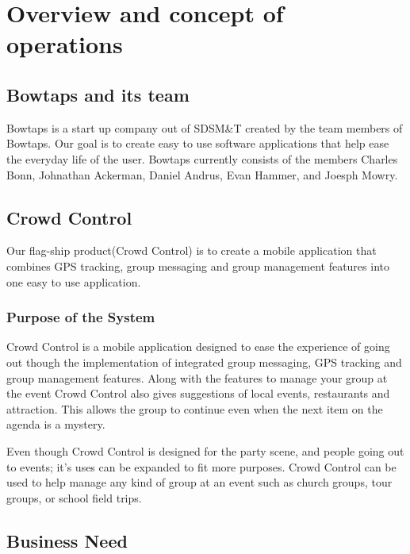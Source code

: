 

\chapter{Overview and concept of operations}


\section{Bowtaps and its team}

Bowtaps is a start up company out of SDSM\&T created by the team members of Bowtaps. Our goal is to create easy to use software applications that help ease the everyday life of the user. Bowtaps currently consists of the members Charles Bonn, Johnathan Ackerman, Daniel Andrus, Evan Hammer, and Joesph Mowry.

\section{Crowd Control}
Our flag-ship product(Crowd Control) is to create a mobile application that combines GPS tracking, group messaging and group management features into one easy to use application. 

\subsection{Purpose of the System}
Crowd Control is a mobile application designed to ease the experience of going out though the implementation of integrated group messaging, GPS tracking and group management features. Along with the features to manage your group at the event Crowd Control also gives suggestions of local events, restaurants and attraction. This allows the group to continue even when the next item on the agenda is a mystery. 


Even though Crowd Control is designed for the party scene, and people going out to events; it's uses can be expanded to fit more purposes. Crowd Control can be used to help manage any kind of group at an event such as church groups, tour groups, or school field trips.

\section{Business Need}

